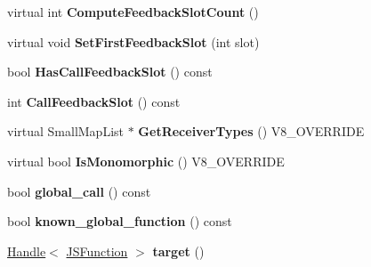 \begin{DoxyCompactItemize}
\item 
\hypertarget{classv8_1_1internal_1_1_v8___f_i_n_a_l_ad227c78a22ace5712b786085f6666403}{}virtual int {\bfseries Compute\+Feedback\+Slot\+Count} ()\label{classv8_1_1internal_1_1_v8___f_i_n_a_l_ad227c78a22ace5712b786085f6666403}

\item 
\hypertarget{classv8_1_1internal_1_1_v8___f_i_n_a_l_a9d78506d71ca20df81cdbc154ce35f88}{}virtual void {\bfseries Set\+First\+Feedback\+Slot} (int slot)\label{classv8_1_1internal_1_1_v8___f_i_n_a_l_a9d78506d71ca20df81cdbc154ce35f88}

\item 
\hypertarget{classv8_1_1internal_1_1_v8___f_i_n_a_l_a656b17b742da41951eb0de6ab4a02ccc}{}bool {\bfseries Has\+Call\+Feedback\+Slot} () const \label{classv8_1_1internal_1_1_v8___f_i_n_a_l_a656b17b742da41951eb0de6ab4a02ccc}

\item 
\hypertarget{classv8_1_1internal_1_1_v8___f_i_n_a_l_a35078c31d1b5824e1345e04380b6815b}{}int {\bfseries Call\+Feedback\+Slot} () const \label{classv8_1_1internal_1_1_v8___f_i_n_a_l_a35078c31d1b5824e1345e04380b6815b}

\item 
\hypertarget{classv8_1_1internal_1_1_v8___f_i_n_a_l_add3b27d1df1c5e153be402bd03ccffdb}{}virtual Small\+Map\+List $\ast$ {\bfseries Get\+Receiver\+Types} () V8\+\_\+\+O\+V\+E\+R\+R\+I\+D\+E\label{classv8_1_1internal_1_1_v8___f_i_n_a_l_add3b27d1df1c5e153be402bd03ccffdb}

\item 
\hypertarget{classv8_1_1internal_1_1_v8___f_i_n_a_l_ab3b27577f5e222d5cf5e659ec2135e23}{}virtual bool {\bfseries Is\+Monomorphic} () V8\+\_\+\+O\+V\+E\+R\+R\+I\+D\+E\label{classv8_1_1internal_1_1_v8___f_i_n_a_l_ab3b27577f5e222d5cf5e659ec2135e23}

\item 
\hypertarget{classv8_1_1internal_1_1_v8___f_i_n_a_l_a620d596f4cc7813faa7411fc7b55dc1d}{}bool {\bfseries global\+\_\+call} () const \label{classv8_1_1internal_1_1_v8___f_i_n_a_l_a620d596f4cc7813faa7411fc7b55dc1d}

\item 
\hypertarget{classv8_1_1internal_1_1_v8___f_i_n_a_l_ad43877e70935be31e17b27c8c843dcde}{}bool {\bfseries known\+\_\+global\+\_\+function} () const \label{classv8_1_1internal_1_1_v8___f_i_n_a_l_ad43877e70935be31e17b27c8c843dcde}

\item 
\hypertarget{classv8_1_1internal_1_1_v8___f_i_n_a_l_a505fdf7295694c5631964ffe276738c4}{}\hyperlink{classv8_1_1internal_1_1_handle}{Handle}$<$ \hyperlink{classv8_1_1internal_1_1_j_s_function}{J\+S\+Function} $>$ {\bfseries target} ()\label{classv8_1_1internal_1_1_v8___f_i_n_a_l_a505fdf7295694c5631964ffe276738c4}


\end{DoxyCompactItemize}
